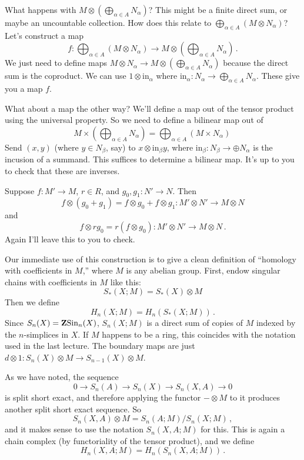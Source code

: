 \begin{property}[Sums]
What happens with $M\otimes\left(\bigoplus_{\alpha\in A}N_\alpha\right)$? This might be a finite direct sum, or maybe an uncountable collection. How does this relate to $\bigoplus_{\alpha\in A}(M\otimes N_\alpha)$? Let's construct a map 
\[
f:\bigoplus_{\alpha\in A}\left(M\otimes N_\alpha\right)\to 
M\otimes\left(\bigoplus_{\alpha\in A}N_\alpha\right)\,.
\]
We just need to define maps $M\otimes N_\alpha\to M\otimes\left(\bigoplus_{\alpha\in A}N_\alpha\right)$ because the direct sum is the coproduct. We can use $1\otimes\text{in}_\alpha$ where $\mathrm{in}_\alpha:N_\alpha\to \bigoplus_{\alpha\in A}N_\alpha$. These give you a map $f$. 

What about a map the other way? We'll define a map out of the tensor product
using the universal property. So we need to define a bilinear map out of
\[
M\times\left(\bigoplus_{\alpha\in A}N_\alpha\right)
=\bigoplus_{\alpha\in A}(M\times N_\alpha)\,
\]
Send
$(x,y)$ (where $y\in N_\beta$, say) to  $x\otimes\mathrm{in}_\beta y$, where
$\mathrm{in}_\beta:N_\beta\to \oplus N_\alpha$ is the incusion of a summand. 
This suffices to determine a bilinear map. It's up to you to check that these are inverses.
\end{property}

\begin{property}[Distributivity] 
Suppose $f:M'\to M$, $r\in R$, and $g_0,g_1:N'\to N$. Then
\[
f\otimes(g_0+g_1)=f\otimes g_0+f\otimes g_1:M'\otimes N'\to M\otimes N
\]
and
\[
f\otimes rg_0=r(f\otimes g_0):M'\otimes N'\to M\otimes N\,.
\]
Again I'll leave this to you to check. 
\end{property}

Our immediate use of this construction is to give a clean definition of 
``homology with coefficients in $M$,'' where $M$ is any abelian group. 
First, endow singular chains with coefficients in $M$ like this:
\[
S_\ast(X;M)=S_\ast(X)\otimes M
\]
Then we define
\[
H_n(X;M)=H_n(S_\ast(X;M))\,.
\]
Since $S_n(X)=\mathbf Z\mathrm{Sin}_n(X)$, $S_n(X;M)$ is a direct sum of copies of $M$
indexed by the $n$-simplices in $X$. If $M$ happens to be a ring, this coincides 
with the notation used in the last lecture. The boundary maps are just 
$d\otimes 1:S_n(X)\otimes M\to S_{n-1}(X)\otimes M$.

As we have noted, the sequence 
\[
0\to S_n(A)\to S_n(X)\to S_n(X,A)\to0
\]
is split short exact, and therefore applying the functor $-\otimes M$ 
to it produces another split short exact sequence. So 
\[
S_n(X,A)\otimes M=S_n(A;M)/S_n(X;M)\,,
\]
and it makes sense to use the notation $S_n(X,A;M)$ for this. This is
again a chain complex (by functoriality of the tensor product), and we define
\[
H_n(X,A;M)=H_n(S_n(X,A;M))\,.
\]

